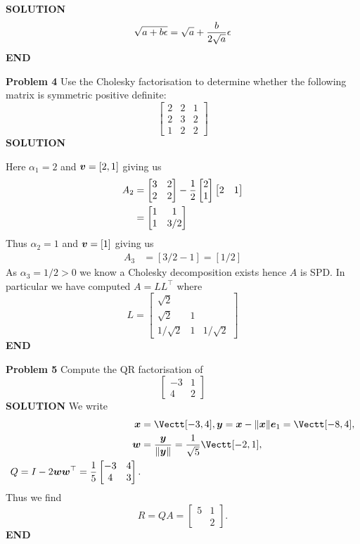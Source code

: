 \documentclass[12pt,a4paper]{article}
\def\x{ {\vc x} }
\def\e{ {\vc e} }
\def\v{ {\vc v} }
\def\y{ {\vc y} }
\def\w{ {\vc w} }
\begin{document}
\textbf{SOLUTION}
\[
\sqrt{a + b \ensuremath{\epsilon}} = \sqrt{a} + {b \over 2 \sqrt{a}}  \ensuremath{\epsilon}
\]
\textbf{END}

\textbf{Problem 4} Use the Cholesky factorisation to determine whether the following matrix is symmetric positive definite:
\[
\begin{bmatrix} 2 & 2 & 1  \\
2 & 3 & 2\\
1 & 2 & 2
\end{bmatrix}
\]
\textbf{SOLUTION}

Here $\ensuremath{\alpha}_1 = 2$ and $\ensuremath{\bm{\v}} = [2,1]$ giving us
\begin{align*}
A_2 &= \begin{bmatrix}
3&2\\
2&2
\end{bmatrix}-{1 \over 2} \begin{bmatrix} 2 \\ 1 \end{bmatrix}\begin{bmatrix} 2 & 1 \end{bmatrix}\\
&=
\begin{bmatrix}
1&1\\
1&3/2
\end{bmatrix}
\end{align*}
Thus $\ensuremath{\alpha}_2 = 1$ and $\ensuremath{\bm{\v}} = [1]$ giving us
\begin{align*}
A_3 &= [3/2 - 1] = [1/2]
\end{align*}
As $\ensuremath{\alpha}_3 = 1/2 > 0$ we know a Cholesky decomposition exists hence $A$ is SPD. In particular we have computed $A = LL^\ensuremath{\top}$ where
\[
L = \begin{bmatrix}
\sqrt{2} \\
\sqrt{2} & 1 \\
1/\sqrt{2} & 1 & 1/\sqrt{2}
\end{bmatrix}
\]
\textbf{END}

\textbf{Problem 5} Compute the QR factorisation of
\[
\begin{bmatrix}
-3 & 1 \\
4 & 2
\end{bmatrix}
\]
\textbf{SOLUTION} We write
\begin{align*}
\ensuremath{\bm{\x}} &= \Vectt[-3,4], \ensuremath{\bm{\y}} = \ensuremath{\bm{\x}} - \| \ensuremath{\bm{\x}}\| \ensuremath{\bm{\e}}_1 = 
\Vectt[-8,4], \\
 \ensuremath{\bm{\w}} &= {\ensuremath{\bm{\y}} \over \| \ensuremath{\bm{\y}} \|} = {1 \over \sqrt{5}} \Vectt[-2,1],\\
 Q = I - 2 \ensuremath{\bm{\w}} \ensuremath{\bm{\w}}^\ensuremath{\top} = {1 \over 5} \begin{bmatrix} -3 & 4 \\ 4 & 3 \end{bmatrix}.
\end{align*}
Thus we find
\[
R = Q A = \begin{bmatrix} 5 & 1 \\ & 2 \end{bmatrix}.
\]
\textbf{END}
\end{document}

